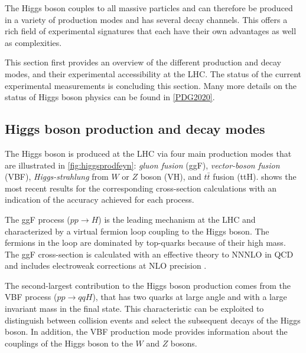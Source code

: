 The Higgs boson couples to all massive particles and can therefore be produced in a variety of production modes and has several decay channels. This offers a rich field of experimental signatures that each have their own advantages as well as complexities. 

This section first provides an overview of the different production and decay modes, and their experimental accessibility at the LHC.
The status of the current experimental measurements is concluding this section.
Many more details on the status of Higgs boson physics can be found in \cref{PDG2020}.

\subsection{Higgs boson production and decay modes}
\label{sec:higgschannels}
The Higgs boson is produced at the LHC via four main production modes that are illustrated in \cref{fig:higgsprodfeyn}: \emph{gluon fusion} (ggF), \emph{vector-boson fusion} (VBF), \emph{Higgs-strahlung} from $W$ or $Z$ boson (VH), and $t\bar{t}$ fusion (ttH).
 shows the most recent results for the corresponding cross-section calculations with an indication of the accuracy achieved for each process.

The ggF process ($pp\rightarrow H$) is the leading mechanism at the LHC and characterized by a virtual fermion loop coupling to the Higgs boson. 
The fermions in the loop are dominated by top-quarks because of their high mass. 
The ggF cross-section is calculated with an effective theory to NNNLO in QCD and includes electroweak corrections at NLO precision \cite{Anastasiou:2016cez}.

The second-largest contribution to the Higgs boson production comes from the VBF process ($pp\rightarrow qqH$), that has two quarks at large angle and with a large invariant mass in the final state.
This characteristic can be exploited to distinguish between collision events and select the subsequent decays of the Higgs boson. 
In addition, the VBF production mode provides information about the couplings of the Higgs boson to the $W$ and $Z$ bosons. 

